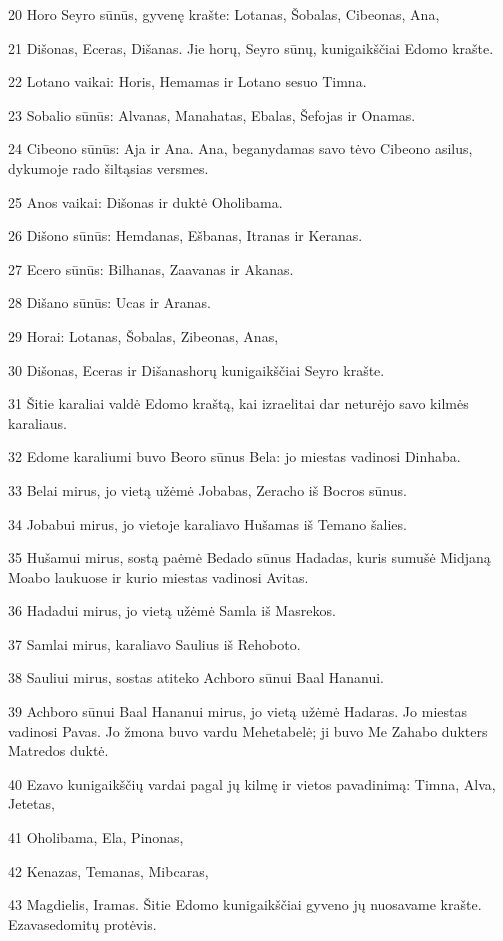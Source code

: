 \par 20 Horo Seyro sūnūs, gyvenę krašte: Lotanas, Šobalas, Cibeonas, Ana, 
\par 21 Dišonas, Eceras, Dišanas. Jie horų, Seyro sūnų, kunigaikščiai Edomo krašte. 
\par 22 Lotano vaikai: Horis, Hemamas ir Lotano sesuo Timna. 
\par 23 Sobalio sūnūs: Alvanas, Manahatas, Ebalas, Šefojas ir Onamas. 
\par 24 Cibeono sūnūs: Aja ir Ana. Ana, beganydamas savo tėvo Cibeono asilus, dykumoje rado šiltąsias versmes. 
\par 25 Anos vaikai: Dišonas ir duktė Oholibama. 
\par 26 Dišono sūnūs: Hemdanas, Ešbanas, Itranas ir Keranas. 
\par 27 Ecero sūnūs: Bilhanas, Zaavanas ir Akanas. 
\par 28 Dišano sūnūs: Ucas ir Aranas. 
\par 29 Horai: Lotanas, Šobalas, Zibeonas, Anas, 
\par 30 Dišonas, Eceras ir Dišanas­horų kunigaikščiai Seyro krašte. 
\par 31 Šitie karaliai valdė Edomo kraštą, kai izraelitai dar neturėjo savo kilmės karaliaus. 
\par 32 Edome karaliumi buvo Beoro sūnus Bela: jo miestas vadinosi Dinhaba. 
\par 33 Belai mirus, jo vietą užėmė Jobabas, Zeracho iš Bocros sūnus. 
\par 34 Jobabui mirus, jo vietoje karaliavo Hušamas iš Temano šalies. 
\par 35 Hušamui mirus, sostą paėmė Bedado sūnus Hadadas, kuris sumušė Midjaną Moabo laukuose ir kurio miestas vadinosi Avitas. 
\par 36 Hadadui mirus, jo vietą užėmė Samla iš Masrekos. 
\par 37 Samlai mirus, karaliavo Saulius iš Rehoboto. 
\par 38 Sauliui mirus, sostas atiteko Achboro sūnui Baal Hananui. 
\par 39 Achboro sūnui Baal Hananui mirus, jo vietą užėmė Hadaras. Jo miestas vadinosi Pavas. Jo žmona buvo vardu Mehetabelė; ji buvo Me Zahabo dukters Matredos duktė. 
\par 40 Ezavo kunigaikščių vardai pagal jų kilmę ir vietos pavadinimą: Timna, Alva, Jetetas, 
\par 41 Oholibama, Ela, Pinonas, 
\par 42 Kenazas, Temanas, Mibcaras, 
\par 43 Magdielis, Iramas. Šitie Edomo kunigaikščiai gyveno jų nuosavame krašte. Ezavas­edomitų protėvis.




